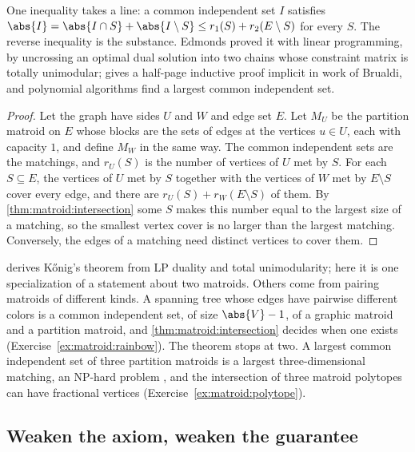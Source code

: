 \begin{refsection}
One inequality takes a line: a common independent set $I$ satisfies $\abs{I}=\abs{I\cap S}+\abs{I\setminus S}\le r_1(S)+r_2(E\setminus S)$ for every $S$. The reverse inequality is the substance. Edmonds proved it with linear programming, by uncrossing an optimal dual solution into two chains whose constraint matrix is totally unimodular; \textcite[Theorem~41.1]{Schrijver2003} gives a half-page inductive proof implicit in work of Brualdi, and polynomial algorithms find a largest common independent set.


\begin{proof}
Let the graph have sides $U$ and $W$ and edge set $E$. Let $M_U$ be the partition matroid on $E$ whose blocks are the sets of edges at the vertices $u\in U$, each with capacity $1$, and define $M_W$ in the same way. The common independent sets are the matchings, and $r_U(S)$ is the number of vertices of $U$ met by $S$. For each $S\subseteq E$, the vertices of $U$ met by $S$ together with the vertices of $W$ met by $E\setminus S$ cover every edge, and there are $r_U(S)+r_W(E\setminus S)$ of them. By \cref{thm:matroid:intersection} some $S$ makes this number equal to the largest size of a matching, so the smallest vertex cover is no larger than the largest matching. Conversely, the edges of a matching need distinct vertices to cover them.
\end{proof}

 derives K\H{o}nig's theorem from LP duality and total unimodularity; here it is one specialization of a statement about two matroids. Others come from pairing matroids of different kinds. A spanning tree whose edges have pairwise different colors is a common independent set, of size $\abs{V}-1$, of a graphic matroid and a partition matroid, and \cref{thm:matroid:intersection} decides when one exists (Exercise~\ref{ex:matroid:rainbow}). The theorem stops at two. A largest common independent set of three partition matroids is a largest three-dimensional matching, an NP-hard problem \parencite{Karp1972}, and the intersection of three matroid polytopes can have fractional vertices (Exercise~\ref{ex:matroid:polytope}).

\subsection{Weaken the axiom, weaken the guarantee}\label{sec:matroid:submodular}


\end{refsection}
